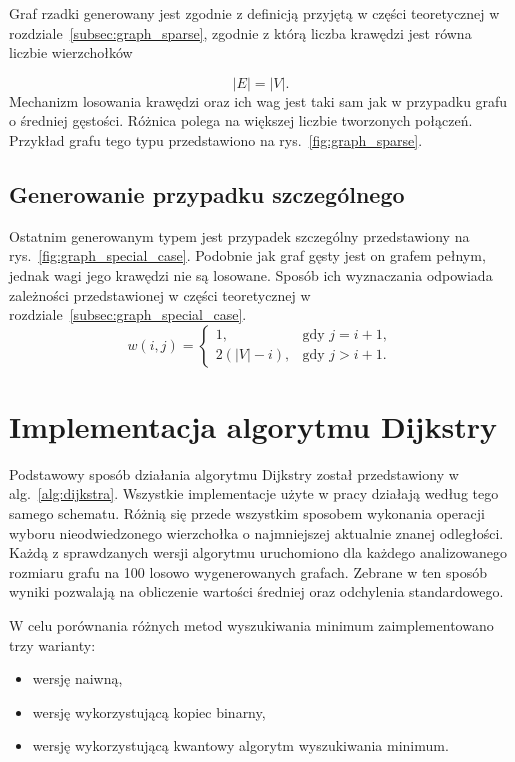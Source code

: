 Graf rzadki generowany jest zgodnie z definicją przyjętą w części teoretycznej w rozdziale~\ref{subsec:graph_sparse}, zgodnie z którą liczba krawędzi jest równa liczbie wierzchołków

\begin{equation}
    |E| = |V|.
\end{equation}
\noindent
Mechanizm losowania krawędzi oraz ich wag jest taki sam jak w przypadku grafu o średniej gęstości. Różnica polega na większej liczbie tworzonych połączeń. Przykład grafu tego typu przedstawiono na rys.~\ref{fig:graph_sparse}.

\subsection{Generowanie przypadku szczególnego}

Ostatnim generowanym typem jest przypadek szczególny przedstawiony na rys.~\ref{fig:graph_special_case}. Podobnie jak graf gęsty jest on grafem pełnym, jednak wagi jego krawędzi nie są losowane. Sposób ich wyznaczania odpowiada zależności przedstawionej w części teoretycznej w rozdziale~\ref{subsec:graph_special_case}. 
\begin{equation}
\label{eq:graph_special_case_create2} 
w(i,j)=\begin{cases}1, & \text{gdy } j=i+1,\\[6pt]2\left(|V|-i\right), & \text{gdy } j>i+1.
\end{cases}
\end{equation}

\section{Implementacja algorytmu Dijkstry}
\label{sec:dijkstra_implementation}

Podstawowy sposób działania algorytmu Dijkstry został przedstawiony w alg.~\ref{alg:dijkstra}. Wszystkie implementacje użyte w pracy działają według tego samego schematu. Różnią się przede wszystkim sposobem wykonania operacji wyboru nieodwiedzonego wierzchołka o najmniejszej aktualnie znanej odległości. Każdą z sprawdzanych wersji algorytmu uruchomiono dla każdego analizowanego rozmiaru grafu na 100 losowo wygenerowanych grafach.  Zebrane w ten sposób wyniki pozwalają na obliczenie wartości średniej oraz odchylenia standardowego.

W celu porównania różnych metod wyszukiwania minimum zaimplementowano trzy warianty:
\begin{itemize}
    \item wersję naiwną,
    \item wersję wykorzystującą kopiec binarny,
    \item wersję wykorzystującą kwantowy algorytm wyszukiwania minimum.
\end{itemize}

